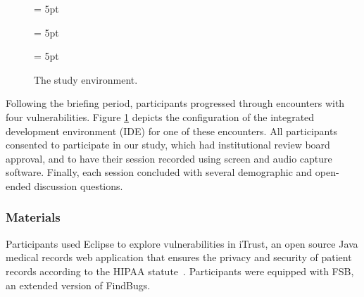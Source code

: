 \documentclass{sig-alternate}
\begin{document}
\begin{figure}
	\subfigcapskip = 5pt
	
	\subfigcapskip = 5pt
	
	\subfigcapskip = 5pt
	
	
	\caption{The study environment.}
	\label{fig:environment} 
\end{figure}

Following the briefing period, participants progressed through encounters with four vulnerabilities. 
Figure \ref{fig:environment} depicts the configuration of the integrated development environment (IDE) for one of these encounters.
All participants consented to participate in our study, which had institutional review board approval, and to have their session recorded using screen and audio capture software.
Finally, each session concluded with several demographic and open-ended discussion questions.



\subsubsection{Materials}
Participants used Eclipse to explore vulnerabilities in iTrust, an open source Java medical records web application that ensures the privacy and security of patient records according to the HIPAA statute~\cite{HIPAA}. 
Participants were equipped with FSB, an extended version of FindBugs.
\end{document}
